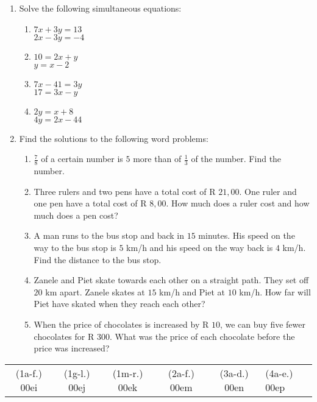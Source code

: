 \begin{eocexercises}{}
\begin{enumerate}[itemsep=5pt, label=\textbf{\arabic*}. ]
\item Solve the following simultaneous equations:
\begin{enumerate}[itemsep=5pt,label=\textbf{(\alph*)}]
\item $7x+3y=13$\\$2x-3y=-4$  
\item $10=2x+y$\\$y=x-2$
\item $7x-41=3y$\\$17=3x-y$
\item $2y=x+8$\\$4y=2x-44$
\end{enumerate}

\item Find the solutions to the following word problems:
\begin{enumerate}[itemsep=5pt,label=\textbf{(\alph*)}]
\item $\frac{7}{8}$ of a certain number is $5$ more than of $\frac{1}{3}$ of the number. Find the number.
\item Three rulers and two pens have a total cost of R $21,00$. One ruler and one pen have a total cost of R $8,00$. How much does a ruler cost and how much does a pen cost? 
\item A man runs to the bus stop and back in $15$ minutes. His speed on the way to the bus stop is $5$ km/h and his speed on the way back is $4$ km/h. Find the distance to the bus stop.
\item Zanele and Piet skate towards each other on a straight path. They set off $20$ km apart. Zanele skates at $15$ km/h and Piet at $10$ km/h. How far will Piet have skated when they reach each other?
\item When the price of chocolates is increased by R $10$, we can buy five fewer chocolates for R $300$. What was the price of each chocolate before the price was increased?
\end{enumerate}
\end{enumerate}
\practiceinfo
\par 
\par \begin{tabular}[h]{ccccc} 
(1a-f.) 00ei&  (1g-l.) 00ej& (1m-r.) 00ek&  (2a-f.) 00em&  (3a-d.) 00en&  (4a-e.) 00ep\end{tabular}

\end{eocexercises}
